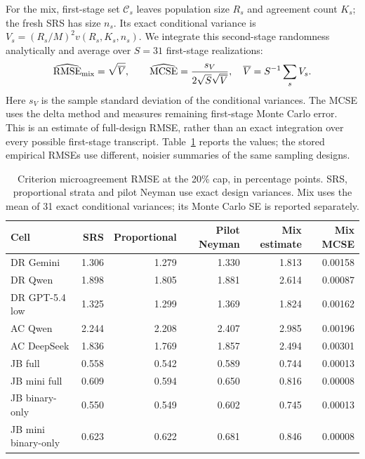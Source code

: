 For the mix, first-stage set $\mathcal C_s$ leaves population size $R_s$ and
agreement count $K_s$; the fresh SRS has size $n_s$. Its exact conditional
variance is $V_s=(R_s/M)^2v(R_s,K_s,n_s)$. We integrate this second-stage
randomness analytically and average over $S=31$ first-stage realizations:
\begin{equation}
 \widehat{\operatorname{RMSE}}_{\rm mix}=\sqrt{\overline V},\qquad
 \widehat{\operatorname{MCSE}}=
 \frac{s_V}{2\sqrt{S}\sqrt{\overline V}},
 \quad \overline V=S^{-1}\sum_s V_s.
\end{equation}
Here $s_V$ is the sample standard deviation of the conditional variances.
The MCSE uses the delta method and measures remaining first-stage Monte
Carlo error. This is an estimate of full-design RMSE, rather than an exact
integration over every possible first-stage transcript. Table~\ref{tab:design-risk}
reports the values; the stored empirical RMSEs use different, noisier
summaries of the same sampling designs.


\begin{table}[htbp]
\centering\small
\caption{Criterion microagreement RMSE at the 20\% cap, in percentage points. SRS, proportional strata and pilot Neyman use exact design variances. Mix uses the mean of 31 exact conditional variances; its Monte Carlo SE is reported separately.}\label{tab:design-risk}
\begin{tabular}{lrrrrr}
\toprule
Cell & SRS & Proportional & Pilot Neyman & Mix estimate & Mix MCSE\\
\midrule
DR Gemini & 1.306 & 1.279 & 1.330 & 1.813 & 0.00158\\
DR Qwen & 1.898 & 1.805 & 1.881 & 2.614 & 0.00087\\
DR GPT-5.4 low & 1.325 & 1.299 & 1.369 & 1.824 & 0.00162\\
AC Qwen & 2.244 & 2.208 & 2.407 & 2.985 & 0.00196\\
AC DeepSeek & 1.836 & 1.769 & 1.857 & 2.494 & 0.00301\\
JB full & 0.558 & 0.542 & 0.589 & 0.744 & 0.00013\\
JB mini full & 0.609 & 0.594 & 0.650 & 0.816 & 0.00008\\
JB binary-only & 0.550 & 0.549 & 0.602 & 0.745 & 0.00013\\
JB mini binary-only & 0.623 & 0.622 & 0.681 & 0.846 & 0.00008\\
\bottomrule
\end{tabular}
\end{table}

